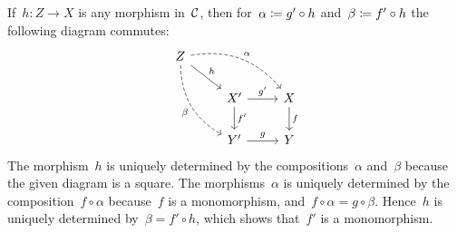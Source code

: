 \section{}


If~$h \colon Z \to X$ is any morphism in~$\mathcal{C}$, then for~$\alpha \coloneqq g' \circ h$ and~$\beta \coloneqq f' \circ h$ the following diagram commutes:
\[
  \begin{tikzcd}
      Z
      \arrow[dashed,bend left]{drr}[above right]{\alpha}
      \arrow{dr}[above right]{h}
      \arrow[dashed,bend right]{ddr}[below left]{\beta}
    & {}
    & {}
    \\
      {}
    & X'
      \arrow{r}[above]{g'}
      \arrow{d}[right]{f'}
    & X
      \arrow{d}[right]{f}
    \\
      {}
    & Y'
      \arrow{r}[above]{g}
    & Y
  \end{tikzcd}
\]
The morphism~$h$ is uniquely determined by the compositions~$\alpha$ and~$\beta$ because the given diagram is a {\pb} square.
The morphisms~$\alpha$ is uniquely determined by the composition~$f \circ \alpha$ because~$f$ is a monomorphism, and~$f \circ \alpha = g \circ \beta$.
Hence~$h$ is uniquely determined by~$\beta = f' \circ h$, which shows that~$f'$ is a monomorphism.
